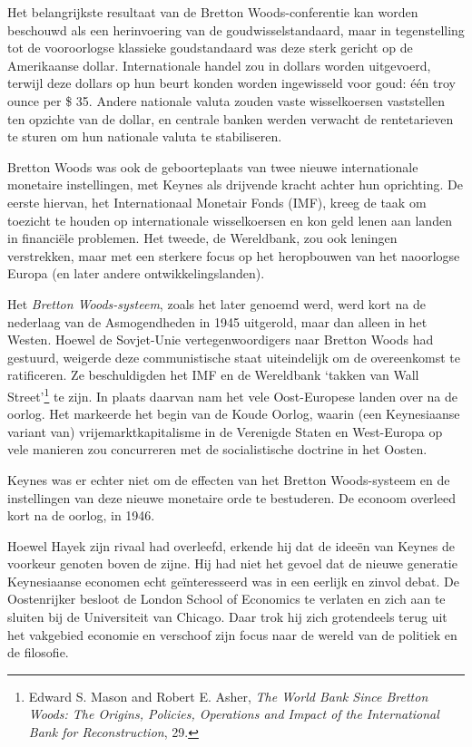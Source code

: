 \documentclass[
  a5paper,
  smalldemyvopaper,11pt,twoside,onecolumn,openright,extrafontsizes,
hidelinks]{memoir}
\begin{document}
Het belangrijkste resultaat van de Bretton Woods-conferentie kan worden
beschouwd als een herinvoering van de goudwisselstandaard, maar in
tegenstelling tot de vooroorlogse klassieke goudstandaard was deze sterk
gericht op de Amerikaanse dollar. Internationale handel zou in dollars
worden uitgevoerd, terwijl deze dollars op hun beurt konden worden
ingewisseld voor goud: één troy ounce per \$ 35. Andere nationale valuta
zouden vaste wisselkoersen vaststellen ten opzichte van de dollar, en
centrale banken werden verwacht de rentetarieven te sturen om hun
nationale valuta te stabiliseren.

Bretton Woods was ook de geboorteplaats van twee nieuwe internationale
monetaire instellingen, met Keynes als drijvende kracht achter hun
oprichting. De eerste hiervan, het Internationaal Monetair Fonds (IMF),
kreeg de taak om toezicht te houden op internationale wisselkoersen en
kon geld lenen aan landen in financiële problemen. Het tweede, de
Wereldbank, zou ook leningen verstrekken, maar met een sterkere focus op
het heropbouwen van het naoorlogse Europa (en later andere
ontwikkelingslanden).

Het \emph{Bretton Woods-systeem}, zoals het later genoemd werd, werd
kort na de nederlaag van de Asmogendheden in 1945 uitgerold, maar dan
alleen in het Westen. Hoewel de Sovjet-Unie vertegenwoordigers naar
Bretton Woods had gestuurd, weigerde deze communistische staat
uiteindelijk om de overeenkomst te ratificeren. Ze beschuldigden het IMF
en de Wereldbank `takken van Wall Street'\footnote{\hspace{0pt}Edward S.
  Mason and Robert E. Asher, \emph{The World Bank Since Bretton Woods:
  The Origins, Policies, Operations and Impact of the International Bank
  for Reconstruction}, 29.} te zijn. In plaats daarvan nam het vele
Oost-Europese landen over na de oorlog. Het markeerde het begin van de
Koude Oorlog, waarin (een Keynesiaanse variant van)
vrijemarktkapitalisme in de Verenigde Staten en West-Europa op vele
manieren zou concurreren met de socialistische doctrine in het Oosten.

Keynes was er echter niet om de effecten van het Bretton Woods-systeem
en de instellingen van deze nieuwe monetaire orde te bestuderen. De
econoom overleed kort na de oorlog, in 1946.

Hoewel Hayek zijn rivaal had overleefd, erkende hij dat de ideeën van
Keynes de voorkeur genoten boven de zijne. Hij had niet het gevoel dat
de nieuwe generatie Keynesiaanse economen echt geïnteresseerd was in een
eerlijk en zinvol debat. De Oostenrijker besloot de London School of
Economics te verlaten en zich aan te sluiten bij de Universiteit van
Chicago. Daar trok hij zich grotendeels terug uit het vakgebied economie
en verschoof zijn focus naar de wereld van de politiek en de filosofie.
\end{document}
